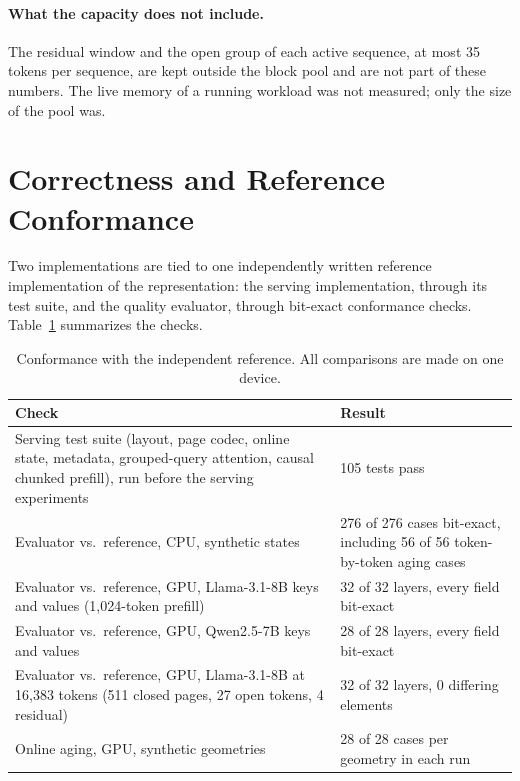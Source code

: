 \documentclass{article}
\begin{document}
\paragraph{What the capacity does not include.}
The residual window and the open group of each active sequence, at most 35 tokens per sequence, are
kept outside the block pool and are not part of these numbers. The live memory of a running workload
was not measured; only the size of the pool was.

\section{Correctness and Reference Conformance}
\label{app:conformance}

Two implementations are tied to one independently written reference implementation of the
representation: the serving implementation, through its test suite, and the quality evaluator, through
bit-exact conformance checks. Table~\ref{tab:app-conf} summarizes the checks.

\begin{table}[h]
\centering
\small
\setlength{\tabcolsep}{3pt}
\begin{tabular}{@{}p{}p{}@{}}
\toprule
Check & Result \\
\midrule
Serving test suite (layout, page codec, online state, metadata, grouped-query attention, causal
chunked prefill), run before the serving experiments & 105 tests pass \\
Evaluator vs.\ reference, CPU, synthetic states & 276 of 276 cases bit-exact, including 56 of 56
token-by-token aging cases \\
Evaluator vs.\ reference, GPU, Llama-3.1-8B keys and values (1,024-token prefill) & 32 of 32 layers,
every field bit-exact \\
Evaluator vs.\ reference, GPU, Qwen2.5-7B keys and values & 28 of 28 layers, every field bit-exact \\
Evaluator vs.\ reference, GPU, Llama-3.1-8B at 16,383 tokens (511 closed pages, 27 open tokens, 4
residual) & 32 of 32 layers, 0 differing elements \\
Online aging, GPU, synthetic geometries & 28 of 28 cases per geometry in each run \\
\bottomrule
\end{tabular}
\caption{Conformance with the independent reference. All comparisons are made on one device.}
\label{tab:app-conf}
\end{table}
\end{document}
